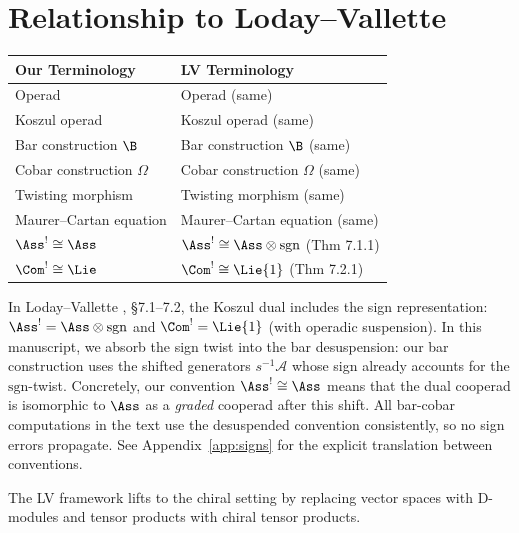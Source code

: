 \section{Relationship to Loday--Vallette}

\begin{tabular}{>{\raggedright\arraybackslash}p{}>{\raggedright\arraybackslash}p{}}
\textbf{Our Terminology} & \textbf{LV Terminology} \\
\hline
Operad & Operad (same) \\
Koszul operad & Koszul operad (same) \\
Bar construction $\B$ & Bar construction $\B$ (same) \\
Cobar construction $\Omega$ & Cobar construction $\Omega$ (same) \\
Twisting morphism & Twisting morphism (same) \\
Maurer--Cartan equation & Maurer--Cartan equation (same) \\
$\Ass^! \cong \Ass$ & $\Ass^! \cong \Ass \otimes \mathrm{sgn}$ (Thm 7.1.1) \\
$\Com^! \cong \Lie$ & $\Com^! \cong \Lie\{1\}$ (Thm 7.2.1) \\
\end{tabular}
\begin{remark}
In Loday--Vallette \cite{LV12}, \S7.1--7.2, the Koszul dual includes the sign representation: $\Ass^! = \Ass \otimes \mathrm{sgn}$ and $\Com^! = \Lie\{1\}$ (with operadic suspension). In this manuscript, we absorb the sign twist into the bar desuspension: our bar construction uses the shifted generators $s^{-1}\mathcal{A}$ whose sign already accounts for the $\mathrm{sgn}$-twist. Concretely, our convention $\Ass^! \cong \Ass$ means that the dual cooperad is isomorphic to $\Ass$ as a \emph{graded} cooperad after this shift. All bar-cobar computations in the text use the desuspended convention consistently, so no sign errors propagate. See Appendix~\ref{app:signs} for the explicit translation between conventions.
\end{remark}

\begin{remark}
The LV framework lifts to the chiral setting by replacing vector spaces with D-modules and tensor products with chiral tensor products.
\end{remark}

